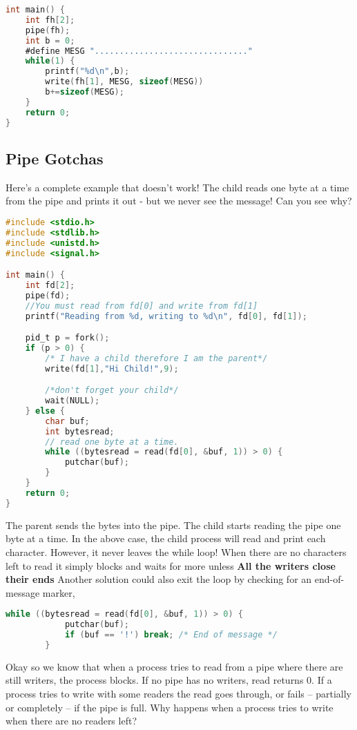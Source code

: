 \begin{lstlisting}[language=C]
int main() {
    int fh[2];
    pipe(fh);
    int b = 0;
    #define MESG "..............................."
    while(1) {
        printf("%d\n",b);
        write(fh[1], MESG, sizeof(MESG))
        b+=sizeof(MESG);
    }
    return 0;
}
\end{lstlisting}

\subsection{Pipe Gotchas}

Here's a complete example that doesn't work! The child reads one byte at a time from the pipe and prints it out - but we never see the message! Can you see why?

\begin{lstlisting}[language=C]
#include <stdio.h>
#include <stdlib.h>
#include <unistd.h>
#include <signal.h>

int main() {
    int fd[2];
    pipe(fd);
    //You must read from fd[0] and write from fd[1]
    printf("Reading from %d, writing to %d\n", fd[0], fd[1]);

    pid_t p = fork();
    if (p > 0) {
        /* I have a child therefore I am the parent*/
        write(fd[1],"Hi Child!",9);

        /*don't forget your child*/
        wait(NULL);
    } else {
        char buf;
        int bytesread;
        // read one byte at a time.
        while ((bytesread = read(fd[0], &buf, 1)) > 0) {
            putchar(buf);
        }
    }
    return 0;
}
\end{lstlisting}

The parent sends the bytes  into the pipe.
The child starts reading the pipe one byte at a time.
In the above case, the child process will read and print each character.
However, it never leaves the while loop!
When there are no characters left to read it simply blocks and waits for more unless \textbf{All the writers close their ends}
Another solution could also exit the loop by checking for an end-of-message marker,

\begin{lstlisting}[language=C]
        while ((bytesread = read(fd[0], &buf, 1)) > 0) {
            putchar(buf);
            if (buf == '!') break; /* End of message */
        }
\end{lstlisting}


Okay so we know that when a process tries to read from a pipe where there are still writers, the process blocks.
If no pipe has no writers, read returns 0.
If a process tries to write with some readers the read goes through, or fails -- partially or completely -- if the pipe is full.
Why happens when a process tries to write when there are no readers left?

